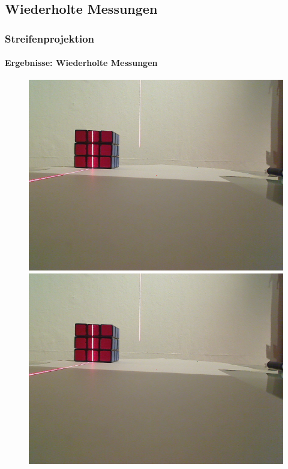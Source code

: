 \documentclass{beamer}
\begin{document}
\subsection{Wiederholte Messungen}
\begin{frame}
	\frametitle{Streifenprojektion}
	\framesubtitle{Ergebnisse: Wiederholte Messungen}
	
	\begin{figure}
		\begin{minipage}{0.32\linewidth}
			\includegraphics[width=\linewidth]{includes/test_repeat_1}
		\end{minipage}
		\hfill
		\begin{minipage}{0.32\linewidth}
			\includegraphics[width=\linewidth]{includes/test_repeat_2}

\end{minipage}
\end{figure}
\end{frame}
\end{document}
